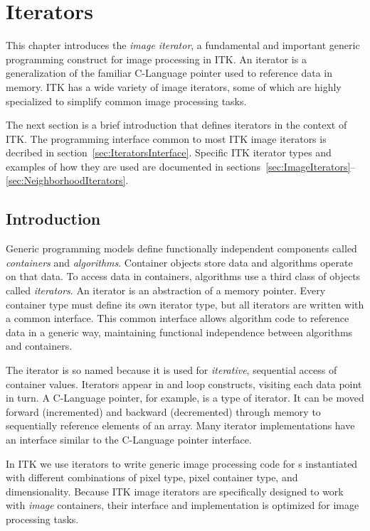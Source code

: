 \chapter{Iterators}
\label{sec:ImageIteratorsChapter}
This chapter introduces the \emph{image iterator}, a fundamental and important
generic programming construct for image processing in ITK.  An iterator is a
generalization of the familiar C-Language pointer used to reference data in
memory.  ITK has a wide variety of image iterators, some of which are highly
specialized to simplify common image processing tasks.

The next section is a brief introduction that defines iterators in the
context of ITK.  The programming interface common to most ITK image iterators
is decribed in section~\ref{sec:IteratorsInterface}.  Specific ITK iterator
types and examples of how they are used are documented in
sections~\ref{sec:ImageIterators}--\ref{sec:NeighborhoodIterators}.

\section{Introduction}
\label{sec:IteratorsIntroduction}
Generic programming models define functionally independent components called
\emph{containers} and \emph{algorithms}.  Container objects store data and
algorithms operate on that data.  To access data in containers, algorithms use
a third class of objects called \emph{iterators}.  An iterator is an
abstraction of a memory pointer.  Every container type must define its own
iterator type, but all iterators are written with a common interface.  This
common interface allows algorithm code to reference data in a generic way,
maintaining functional independence between algorithms and containers.

The iterator is so named because it is used for \emph{iterative}, sequential
access of container values.  Iterators appear in  and
 loop constructs, visiting each data point in turn.  A C-Language pointer,
for example, is a type of iterator.  It can be moved forward (incremented) and
backward (decremented) through memory to sequentially reference elements of an
array. Many iterator implementations have an interface similar to the
C-Language pointer interface. 

In ITK we use iterators to write generic image processing code for
s instantiated with different combinations of pixel type, pixel
container type, and dimensionality.  Because ITK image iterators are
specifically designed to work with \emph{image} containers, their interface and
implementation is optimized for image processing tasks.

